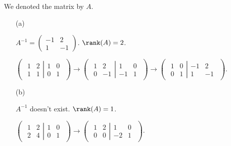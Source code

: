 \begin{Exercise}
We denoted the matrix by $A$.
\begin{enumerate}[(a)]
\item[(a)]
\begin{answer}
$A^{-1} = \begin{pmatrix}
-1 & 2 \\
1 & -1
\end{pmatrix}$. $\rank(A) = 2$.
\end{answer}
\begin{solution}
$\begin{pmatrix} \left.\begin{matrix}
1 & 2 \\
1 & 1
\end{matrix} \right| \begin{matrix}
1 & 0 \\
0 & 1
\end{matrix} \end{pmatrix} \longrightarrow \begin{pmatrix} \left.\begin{matrix}
1 & 2 \\
0 & -1
\end{matrix} \right| \begin{matrix}
1 & 0 \\
-1 & 1
\end{matrix} \end{pmatrix} \longrightarrow \begin{pmatrix} \left.\begin{matrix}
1 & 0 \\
0 & 1
\end{matrix} \right| \begin{matrix}
-1 & 2 \\
1 & -1
\end{matrix} \end{pmatrix}$.
\end{solution}

\item[(b)]
\begin{answer}
$A^{-1}$ doesn't exist. $\rank(A) = 1$.
\end{answer}
\begin{solution}
$\begin{pmatrix} \left.\begin{matrix}
1 & 2 \\
2 & 4
\end{matrix} \right| \begin{matrix}
1 & 0 \\
0 & 1
\end{matrix} \end{pmatrix} \longrightarrow \begin{pmatrix} \left.\begin{matrix}
1 & 2 \\
0 & 0
\end{matrix} \right| \begin{matrix}
1 & 0 \\
-2 & 1
\end{matrix} \end{pmatrix}$.
\end{solution}


\end{enumerate}
\end{Exercise}
